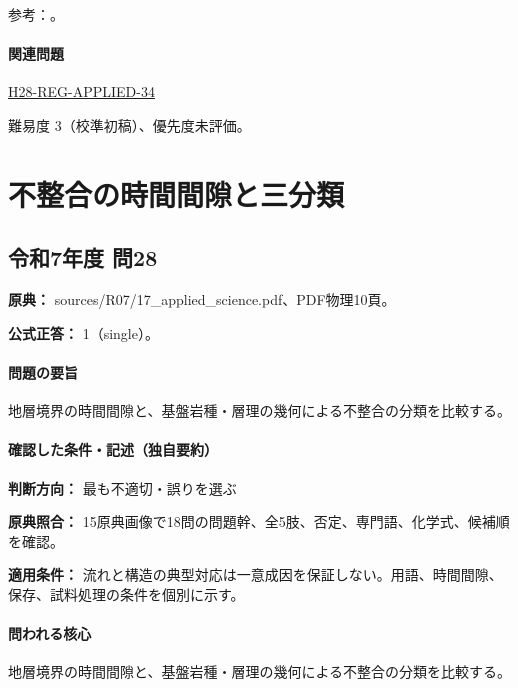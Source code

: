 \par 参考：\cite{volc_usgs_tephra,strat_gsj_tephra2013,strat_gsj_atsumi}。

\paragraph{関連問題} \hyperref[q:h28-reg-applied-34]{H28-REG-APPLIED-34}

\par 難易度 3（校準初稿）、優先度未評価。

\section{不整合の時間間隙と三分類}

\subsection{令和7年度 問28}
\label{q:r07-reg-applied-28}

\noindent\textbf{原典：} sources/R07/17\_applied\_science.pdf、PDF物理10頁。

\textbf{公式正答：} 1（single）。

\paragraph{問題の要旨} 地層境界の時間間隙と、基盤岩種・層理の幾何による不整合の分類を比較する。

\paragraph{確認した条件・記述（独自要約）}\mbox{}\par

\noindent\textbf{判断方向：} 最も不適切・誤りを選ぶ\par

\noindent\textbf{原典照合：} 15原典画像で18問の問題幹、全5肢、否定、専門語、化学式、候補順を確認。\par

\noindent\textbf{適用条件：} 流れと構造の典型対応は一意成因を保証しない。用語、時間間隙、保存、試料処理の条件を個別に示す。\par

\paragraph{問われる核心} 地層境界の時間間隙と、基盤岩種・層理の幾何による不整合の分類を比較する。

